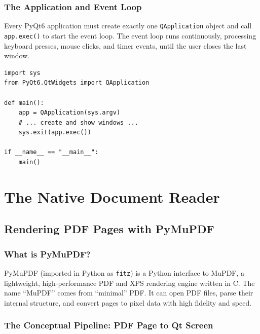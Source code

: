 \documentclass[12pt,oneside]{book}
\begin{document}
\section{The Application and Event Loop}

Every PyQt6 application must create exactly one \texttt{QApplication} object and call
\texttt{app.exec()} to start the event loop. The event loop runs continuously, processing
keyboard presses, mouse clicks, and timer events, until the user closes the last window.

\begin{lstlisting}[caption={Minimal PyQt6 application entry point}]
import sys
from PyQt6.QtWidgets import QApplication

def main():
    app = QApplication(sys.argv)
    # ... create and show windows ...
    sys.exit(app.exec())

if __name__ == "__main__":
    main()
\end{lstlisting}

\part{The Native Document Reader}

\chapter{Rendering PDF Pages with PyMuPDF}
\label{ch:pdf}

\section{What is PyMuPDF?}

PyMuPDF (imported in Python as \texttt{fitz}) is a Python interface to MuPDF, a
lightweight, high-performance PDF and XPS rendering engine written in C. The name
``MuPDF'' comes from ``minimal'' PDF. It can open PDF files, parse their internal
structure, and convert pages to pixel data with high fidelity and speed.

\section{The Conceptual Pipeline: PDF Page to Qt Screen}
\end{document}
